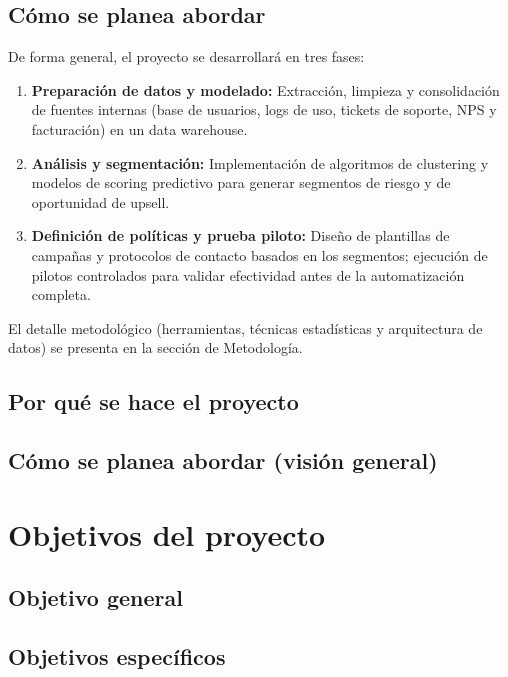 \subsection{Cómo se planea abordar}
De forma general, el proyecto se desarrollará en tres fases:
\begin{enumerate}
  \item \textbf{Preparación de datos y modelado:} Extracción, limpieza y consolidación de fuentes internas (base de usuarios, logs de uso, tickets de soporte, NPS y facturación) en un data warehouse.
  \item \textbf{Análisis y segmentación:} Implementación de algoritmos de clustering y modelos de scoring predictivo para generar segmentos de riesgo y de oportunidad de upsell.
  \item \textbf{Definición de políticas y prueba piloto:} Diseño de plantillas de campañas y protocolos de contacto basados en los segmentos; ejecución de pilotos controlados para validar efectividad antes de la automatización completa.
\end{enumerate}

El detalle metodológico (herramientas, técnicas estadísticas y arquitectura de datos) se presenta en la sección de Metodología.

\subsection{Por qué se hace el proyecto}
\subsection{Cómo se planea abordar (visión general)}

\section{Objetivos del proyecto}
\subsection{Objetivo general}
\subsection{Objetivos específicos}

